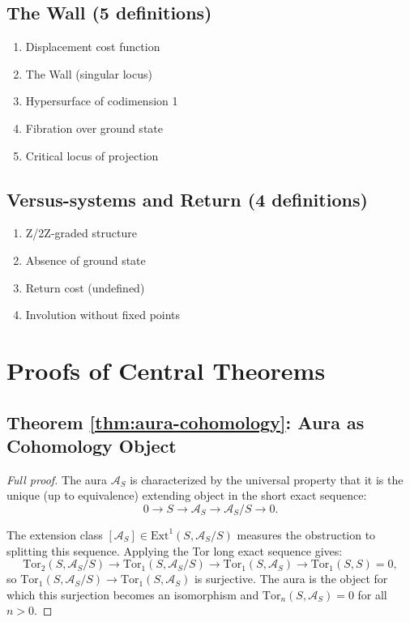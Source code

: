 \documentclass[12pt]{article}
\theoremstyle{definition}
\theoremstyle{remark}
\newcommand{\Ext}{\mathrm{Ext}}
\newcommand{\Tor}{\mathrm{Tor}}
\begin{document}
\subsection{The Wall (5 definitions)}
\begin{enumerate}
\item Displacement cost function
\item The Wall (singular locus)
\item Hypersurface of codimension 1
\item Fibration over ground state
\item Critical locus of projection
\end{enumerate}

\subsection{Versus-systems and Return (4 definitions)}
\begin{enumerate}
\item Z/2Z-graded structure
\item Absence of ground state
\item Return cost (undefined)
\item Involution without fixed points
\end{enumerate}

\section{Proofs of Central Theorems}

\subsection{Theorem \ref{thm:aura-cohomology}: Aura as Cohomology Object}

\begin{proof}[Full proof]
The aura $\mathcal{A}_S$ is characterized by the universal property that it is the unique (up to equivalence) extending object in the short exact sequence:
\[
0 \to S \to \mathcal{A}_S \to \mathcal{A}_S / S \to 0.
\]

The extension class $[\mathcal{A}_S] \in \Ext^1(S, \mathcal{A}_S / S)$ measures the obstruction to splitting this sequence. Applying the Tor long exact sequence gives:
\[
\Tor_2(S, \mathcal{A}_S / S) \to \Tor_1(S, \mathcal{A}_S / S) \to \Tor_1(S, \mathcal{A}_S) \to \Tor_1(S, S) = 0,
\]
so $\Tor_1(S, \mathcal{A}_S / S) \to \Tor_1(S, \mathcal{A}_S)$ is surjective. The aura is the object for which this surjection becomes an isomorphism and $\Tor_n(S, \mathcal{A}_S) = 0$ for all $n > 0$.
\end{proof}
\end{document}
